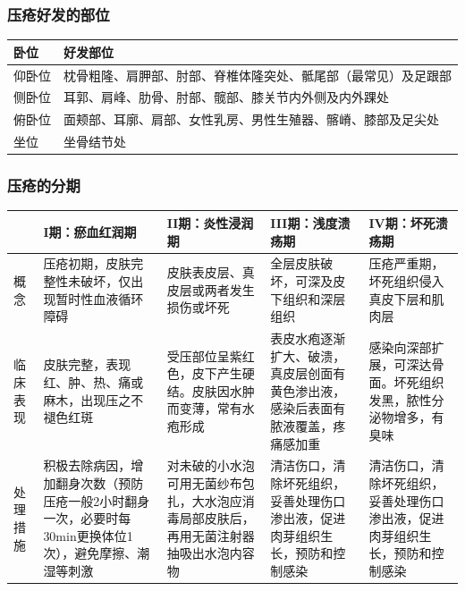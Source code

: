\documentclass[11pt, a4paper]{ctexart}
\begin{document}
\subsubsection{压疮好发的部位}
\begin{table}[htbp]
	\centering
	\begin{tabular}{|l|l|}
		\hline
		\textbf{卧位} & \textbf{好发部位}                   \\
		\hline
		仰卧位         & 枕骨粗隆、肩胛部、肘部、脊椎体隆突处、骶尾部（最常见）及足跟部 \\
		侧卧位         & 耳郭、肩峰、肋骨、肘部、髋部、膝关节内外侧及内外踝处      \\
		俯卧位         & 面颊部、耳廓、肩部、女性乳房、男性生殖器、髂嵴、膝部及足尖处  \\
		坐位          & 坐骨结节处                           \\
		\hline
	\end{tabular}
\end{table}

\subsubsection{压疮的分期}
\begin{table}[htbp]
	\centering
	\begin{tabular}{|p{2cm}|p{3cm}|p{3cm}|p{3cm}|p{3cm}|}
		\hline
		     & \textbf{I期：瘀血红润期}                                       & \textbf{II期：炎性浸润期}                          & \textbf{III期：浅度溃疡期}                      & \textbf{IV期：坏死溃疡期}                     \\
		\hline
		概念   & 压疮初期，皮肤完整性未破坏，仅出现暂时性血液循环障碍                              & 皮肤表皮层、真皮层或两者发生损伤或坏死                         & 全层皮肤破坏，可深及皮下组织和深层组织                      & 压疮严重期，坏死组织侵入真皮下层和肌肉层                   \\
		\hline
		临床表现 & 皮肤完整，表现红、肿、热、痛或麻木，出现压之不褪色红斑                             & 受压部位呈紫红色，皮下产生硬结。皮肤因水肿而变薄，常有水疱形成             & 表皮水疱逐渐扩大、破溃，真皮层创面有黄色渗出液，感染后表面有脓液覆盖，疼痛感加重 & 感染向深部扩展，可深达骨面。坏死组织发黑，脓性分泌物增多，有臭味       \\
		\hline
		处理措施 & 积极去除病因，增加翻身次数（预防压疮一般2小时翻身一次，必要时每30min更换体位1次），避免摩擦、潮湿等刺激 & 对未破的小水泡可用无菌纱布包扎，大水泡应消毒局部皮肤后，再用无菌注射器抽吸出水泡内容物 & 清洁伤口，清除坏死组织，妥善处理伤口渗出液，促进肉芽组织生长，预防和控制感染   & 清洁伤口，清除坏死组织，妥善处理伤口渗出液，促进肉芽组织生长，预防和控制感染 \\
		\hline
	\end{tabular}
\end{table}
\end{document}
